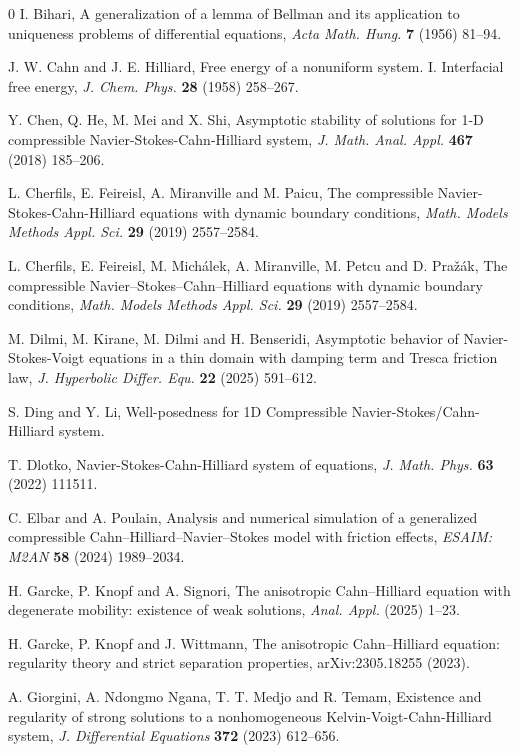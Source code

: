 \documentclass[11pt]{article}
\begin{document}
{\begin{thebibliography}{0}
I. Bihari, A generalization of a lemma of Bellman and its application to uniqueness problems of differential equations, {\it Acta Math. Hung.} {\bf 7} (1956) 81--94.

J. W. Cahn and J. E. Hilliard, Free energy of a nonuniform system. I. Interfacial free energy, {\it J. Chem. Phys.} {\bf 28} (1958) 258--267.

Y. Chen, Q. He, M. Mei and X. Shi, Asymptotic stability of solutions for 1-D compressible Navier-Stokes-Cahn-Hilliard system, {\it J. Math. Anal. Appl.} {\bf 467} (2018) 185--206.

L. Cherfils, E. Feireisl, A. Miranville and M. Paicu, The compressible Navier-Stokes-Cahn-Hilliard equations with dynamic boundary conditions, {\it Math. Models Methods Appl. Sci.} {\bf 29} (2019) 2557--2584.

L. Cherfils, E. Feireisl, M. Mich\'alek, A. Miranville, M. Petcu and D. Pra\v{z}\'ak, The compressible Navier--Stokes--Cahn--Hilliard equations with dynamic boundary conditions, {\it Math. Models Methods Appl. Sci.} {\bf 29} (2019) 2557--2584.

M. Dilmi, M. Kirane, M. Dilmi and H. Benseridi, Asymptotic behavior of Navier-Stokes-Voigt equations in a thin domain with damping term and Tresca friction law, {\it J. Hyperbolic Differ. Equ.} {\bf 22} (2025) 591--612.

S. Ding and Y. Li, Well-posedness for 1D Compressible Navier-Stokes/Cahn-Hilliard system.

T. Dlotko, Navier-Stokes-Cahn-Hilliard system of equations, {\it J. Math. Phys.} {\bf 63} (2022) 111511.

C. Elbar and A. Poulain, Analysis and numerical simulation of a generalized compressible Cahn--Hilliard--Navier--Stokes model with friction effects, {\it ESAIM: M2AN} {\bf 58} (2024) 1989--2034.

H. Garcke, P. Knopf and A. Signori, The anisotropic Cahn--Hilliard equation with degenerate mobility: existence of weak solutions, {\it Anal. Appl.} (2025) 1--23.

H. Garcke, P. Knopf and J. Wittmann, The anisotropic Cahn--Hilliard equation: regularity theory and strict separation properties, arXiv:2305.18255 (2023).

A. Giorgini, A. Ndongmo Ngana, T. T. Medjo and R. Temam, Existence and regularity of strong solutions to a nonhomogeneous Kelvin-Voigt-Cahn-Hilliard system, {\it J. Differential Equations} {\bf 372} (2023) 612--656.


\end{thebibliography}}
\end{document}
